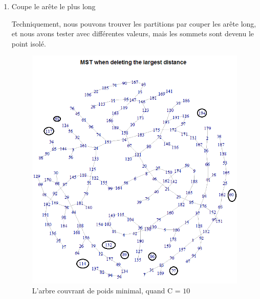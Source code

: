\begin{enumerate}
  \item Coupe le arête le plus long
  
  Techniquement, nous pouvons trouver les partitions par couper les arête long, et nous avons tester avec différentes valeurs, mais les sommets sont devenu le point isolé.
  
  \begin{figure}[H]
\centering
\includegraphics[width=0.6\linewidth]{images/mst10}
\caption{L'arbre couvrant de poids minimal, quand C = $10$}
\label{fig:mst10}
\end{figure}

  \end{enumerate}








